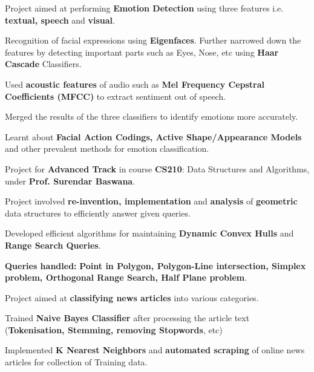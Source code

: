 \documentclass[a4paper]{norm-resume}
\begin{document}
	\vspace{2mm}
	
	   
	\begin{tightitemize}
	\small
	{
	\item Project aimed at performing \textbf{Emotion Detection} using three features i.e. \textbf{textual, speech} and \textbf{visual}.
	\item Recognition of facial expressions using \textbf{Eigenfaces}. Further narrowed down the features by detecting important parts such as Eyes, Nose, etc using \textbf{Haar Cascade} Classifiers.
	\item Used \textbf{acoustic features} of audio such as \textbf{Mel Frequency Cepstral Coefficients (MFCC)} to extract sentiment out of speech.
	\item Merged the results of the three classifiers to identify emotions more accurately.
	\item Learnt about \textbf{Facial Action Codings, Active Shape/Appearance Models} and other prevalent methods for emotion classification.
	}
	\end{tightitemize}
		
	\vspace{2mm}
	
	   \descript{Sep '14 - Nov '14}
	\begin{tightitemize}
	\small
	{
	\item Project for \textbf{Advanced Track} in course \textbf{CS210}: Data Structures and Algorithms, under \textbf{Prof. Surendar Baswana}.
	\item Project involved \textbf{re-invention, implementation} and \textbf{analysis} of \textbf{geometric} data structures to efficiently answer given queries.
	\item Developed efficient algorithms for maintaining \textbf{Dynamic Convex Hulls} and \textbf{Range Search Queries}.
	\item \textbf{Queries handled:} \textbf{Point in Polygon, Polygon-Line intersection, Simplex problem, Orthogonal Range Search, Half Plane problem}.
	}
	\end{tightitemize}
 		
	\vspace{2mm}
		
	   \descript{Jan '14 - Apr '14}
	\begin{tightitemize}
	\small
	{
	\item Project aimed at \textbf{classifying news articles} into various categories.
	\item Trained \textbf{Naive Bayes Classifier} after processing the article text (\textbf{Tokenisation, Stemming, removing Stopwords}, etc)
	\item Implemented \textbf{K Nearest Neighbors} and \textbf{automated scraping} of online news articles for collection of Training data.
	}
	\end{tightitemize}
 		
\end{document}
